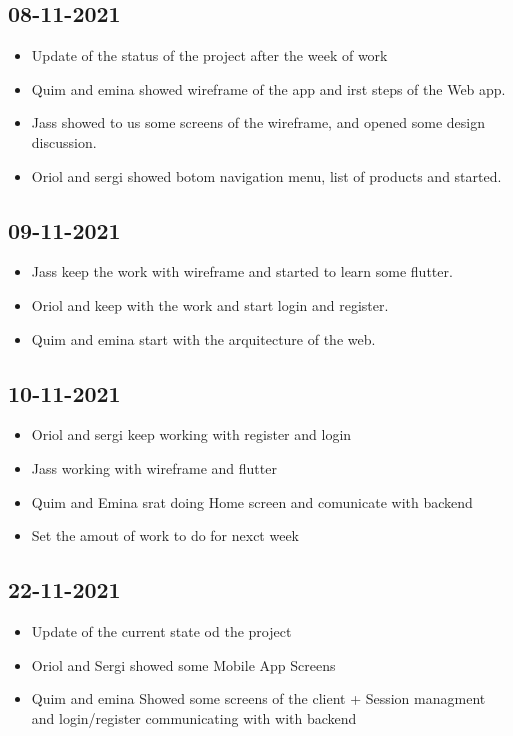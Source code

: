 \documentclass[./main.tex]{subfiles}
\begin{document}
\subsection{08-11-2021}
\begin{itemize}
\item Update of the status of the project after the week of work
\item Quim and emina showed wireframe of the app and irst steps of the Web app.
\item Jass showed to us some screens of the wireframe, and opened some design discussion.
\item Oriol and sergi showed botom navigation menu, list of products and started.
\end{itemize}


\subsection{09-11-2021}
\begin{itemize}
\item Jass keep the work with wireframe and started to learn some flutter.
\item Oriol and keep with the work and start login and register.
\item Quim and emina start with the arquitecture of the web.
\end{itemize}


\subsection{10-11-2021}
\begin{itemize}
\item Oriol and sergi keep working with register and login
\item Jass working with wireframe and flutter
\item Quim and Emina srat doing Home screen and comunicate with backend
\item Set the amout of work to do for nexct week
\end{itemize}

\subsection{22-11-2021}
\begin{itemize}
\item Update of the current state od the project
\item Oriol and Sergi showed some Mobile App Screens
\item Quim and emina Showed some screens of the client + Session managment and login/register communicating with with backend
\end{itemize}
\end{document}
